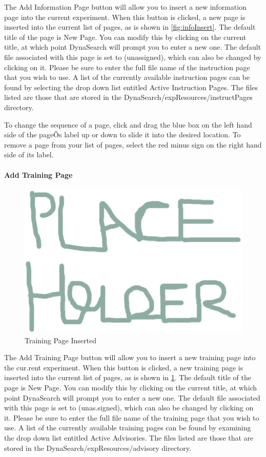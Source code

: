 \documentclass[article]{ij4uq}              %
\begin{document}
The Add Information Page button will allow you to insert a new information page into the current experiment. When this button is clicked, a new page is inserted into the current list of pages, as is shown in \ref{fig:infoInsert}. The default title of the page is New Page. You can modify this by clicking on the current title, at which point DynaSearch will prompt you to enter a new one. The default file associated with this page is set to (unassigned), which can also be changed by clicking on it. Please be sure to enter the full file name of the instruction page that you wish to use. A list of the currently available instruction pages can be found by selecting the drop down list entitled Active Instruction Pages. The files listed are those that are stored in the DynaSearch/expResources/instructPages directory.

To change the sequence of a page, click and drag the blue box on the left hand side of the pageÕs label up or down to slide it into the desired location. To remove a page from your list of pages, select the red minus sign on the right hand side of its label.

\paragraph{Add Training Page}

\begin{figure}[h!]
 \centering
 \includegraphics[width=5.0in]{figures/place.eps}
 \caption{Training Page Inserted}
 \label{fig:trainInsert}
\end{figure}
\FloatBarrier

The Add Training Page button will allow you to insert a new training page into the cur.rent experiment. When this button is clicked, a new training page is inserted into the current list of pages, as is shown in \ref{fig:trainInsert}. The default title of the page is New Page. You can modify this by clicking on the current title, at which point DynaSearch will prompt you to enter a new one. The default file associated with this page is set to (unas.signed), which can also be changed by clicking on it. Please be sure to enter the full file name of the training page that you wish to use. A list of the currently available training pages can be found by examining the drop down list entitled Active Advisories. The files listed are those that are stored in the DynaSearch/expResources/advisory directory.
\end{document}
